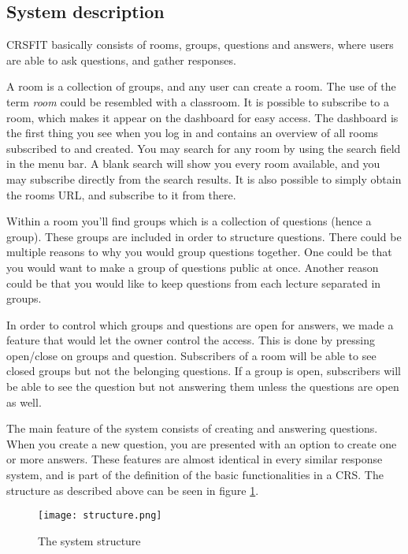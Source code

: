 \subsection{System description}

CRSFIT basically consists of rooms, groups, questions and answers, where users are able to ask questions, and gather responses.

A room is a collection of groups, and any user can create a room. The use of the term \emph{room} could be resembled with a classroom. It is possible to subscribe to a room, which makes it appear on the dashboard for easy access. The dashboard is the first thing you see when you log in and contains an overview of all rooms subscribed to and created. You may search for any room by using the search field in the menu bar. A blank search will show you every room available, and you may subscribe directly from the search results. It is also possible to simply obtain the rooms URL, and subscribe to it from there.

Within a room you'll find groups which is a collection of questions (hence a group). These groups are included in order to structure questions. There could be multiple reasons to why you would group questions together. One could be that you would want to make a group of questions public at once. Another reason could be that you would like to keep questions from each lecture separated in groups.

In order to control which groups and questions are open for answers, we made a feature that would let the owner control the access. This is done by pressing open/close on groups and question. Subscribers of a room will be able to see closed groups but not the belonging questions. If a group is open, subscribers will be able to see the question but not answering them unless the questions are open as well.

The main feature of the system consists of creating and answering questions. When you create a new question, you are presented with an option to create one or more answers.
These features are almost identical in every similar response system, and is part of the definition of the basic functionalities in a CRS. The structure as described above can be seen in figure \ref{fig:structure}.

\begin{figure}[H]
\capstart
	\centering
		\texttt{[image: structure.png]}
	\caption[System Structure]{The system structure\label{fig:structure}}
\end{figure}

